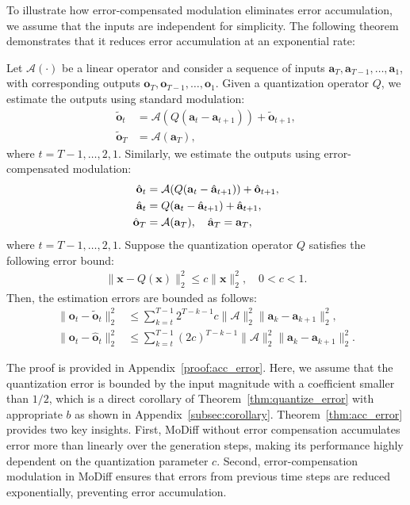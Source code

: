 To illustrate how error-compensated modulation eliminates error accumulation, we assume that the inputs are independent for simplicity. The following theorem demonstrates that it reduces error accumulation at an exponential rate:
\begin{theorem}
\label{thm:acc_error}
Let \(\mathcal{A}(\cdot)\) be a linear operator and consider a sequence of inputs \(\mathbf{a}_T, \mathbf{a}_{T-1}, \dots, \mathbf{a}_1\), with corresponding outputs \(\mathbf{o}_T, \mathbf{o}_{T-1}, \dots, \mathbf{o}_1\). Given a quantization operator \(Q\), we estimate the outputs using standard modulation: 
\begin{align}
    \tilde{\mathbf{o}}_t &= \mathcal{A}(Q(\mathbf{a}_t - \mathbf{a}_{t+1})) + \tilde{\mathbf{o}}_{t+1}, \\
    \tilde{\mathbf{o}}_T &= \mathcal{A}(\mathbf{a}_T),
\end{align}
where \( t = T-1, \dots, 2, 1 \). Similarly, we estimate the outputs using error-compensated modulation:  
\begin{align}
    \hat{\mathbf{o}}_t &= \mathcal{A}(Q(\mathbf{a}_t - \hat{\mathbf{a}}_{t+1})) + \hat{\mathbf{o}}_{t+1}, \\
    \hat{\mathbf{a}}_t &= Q(\mathbf{a}_t - \hat{\mathbf{a}}_{t+1}) + \hat{\mathbf{a}}_{t+1}, \\
    \hat{\mathbf{o}}_T &= \mathcal{A}(\mathbf{a}_T), \quad
    \hat{{\mathbf{a}}}_T = {\mathbf{a}}_T,
\end{align}
where \( t = T-1, \dots, 2, 1 \). Suppose the quantization operator \(Q\) satisfies the following error bound: 
\begin{align}
    \|\mathbf{x} - Q(\mathbf{x})\|_2^2 \leq c\|\mathbf{x}\|_2^2, \quad 0 < c < 1.
\end{align}
Then, the estimation errors are bounded as follows:  
\begin{align}
    \|\mathbf{o}_t - \tilde{\mathbf{o}}_t\|_2^2 &\leq \sum_{k=t}^{T-1} 2^{T-k-1} c \|\mathcal{A}\|_2^2 \|\mathbf{a}_k - \mathbf{a}_{k+1}\|_2^2, \\
    \|\mathbf{o}_t - \hat{\mathbf{o}}_t\|_2^2 &\leq \sum_{k=t}^{T-1} (2c)^{T-k-1} \|\mathcal{A}\|_2^2 \|\mathbf{a}_k - \mathbf{a}_{k+1}\|_2^2.
\end{align}
\end{theorem}



The proof is provided in Appendix~\ref{proof:acc_error}. Here, we assume that the quantization error is bounded by the input magnitude with a coefficient smaller than $1/2$, which is a direct corollary of Theorem~\ref{thm:quantize_error} with appropriate $b$ as shown in Appendix~\ref{subsec:corollary}. Theorem~\ref{thm:acc_error} provides two key insights. First, MoDiff without error compensation accumulates error more than linearly over the generation steps, making its performance highly dependent on the quantization parameter \( c \). Second, error-compensation modulation in MoDiff ensures that errors from previous time steps are reduced exponentially, preventing error accumulation.

